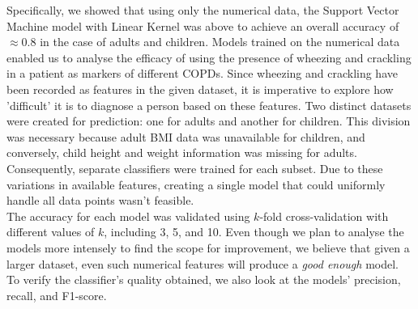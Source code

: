 \documentclass[10pt,twocolumn,letterpaper]{article}
\begin{document}
Specifically, we showed that using only the numerical data, the Support Vector Machine model with Linear Kernel was above to achieve an overall accuracy of $\approx 0.8$ in the case of adults and children. Models trained on the numerical data enabled us to analyse the efficacy of using the presence of wheezing and crackling in a patient as markers of different COPDs. Since wheezing and crackling have been recorded as features in the given dataset, it is imperative to explore how 'difficult' it is to diagnose a person based on these features. Two distinct datasets were created for prediction: one for adults and another for children. This division was necessary because adult BMI data was unavailable for children, and conversely, child height and weight information was missing for adults. Consequently, separate classifiers were trained for each subset. Due to these variations in available features, creating a single model that could uniformly handle all data points wasn't feasible.
\\The accuracy for each model was validated using $k$-fold cross-validation with different values of $k$, including 3, 5, and 10. Even though we plan to analyse the models more intensely to find the scope for improvement, we believe that given a larger dataset, even such numerical features will produce a \textit{good enough} model. To verify the classifier's quality obtained, we also look at the models' precision, recall, and F1-score.
\end{document}
